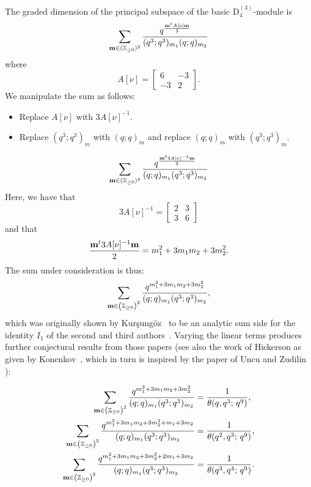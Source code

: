 \documentclass[ALCO,Unicode,published]{cedram}
\begin{document}
The graded dimension of the principal subspace of the basic $\mathrm{D}_4^{(3)}$-module is
\begin{equation}
\sum_{{\bf m} \in (\mathbb{Z}_{\ge 0})^2} \frac{q^{\frac{{\bf m}^t A[\nu] {\bf m}}{2}}}{(q^3;q^3)_{m_1} (q;q)_{m_{2}}}
\end{equation}
where 
$$
A[\nu] = \begin{bmatrix}
6 & -3\\
-3 & 2
\end{bmatrix}.$$
We manipulate the sum as follows:
\begin{itemize}
\item Replace $A[\nu]$ with $3A[\nu]^{-1}$.
\item Replace $(q^3;q^3)_m$ with $(q;q)_m$ and replace $(q;q)_m$ with $(q^3;q^3)_m$.
\end{itemize}
\begin{equation}
\sum_{{\bf m} \in (\mathbb{Z}_{\ge 0})^4} \frac{q^{\frac{{\bf m}^t 3A[\nu]^{-1} {\bf m}}{2}}}{(q;q)_{m_1} (q^3;q^3)_{m_{2}}}
\end{equation}
Here, we have that
$$
3A[\nu]^{-1} = \begin{bmatrix}
2 & 3\\
3 & 6
\end{bmatrix}
$$
and that
$$
\frac{{\bf m}^t 3A[\nu]^{-1} {\bf m}}{2} = m_1^2 + 3m_1 m_2 + 3m_2^2.
$$
The sum under consideration is thus:
$$
\sum_{{\bf m} \in \left(\mathbb{Z}_{\ge 0}\right)^2} \frac{q^{ m_1^2 + 3m_1m_2 + 3m_2^2}}{(q;q)_{m_1}(q^3;q^3)_{m_2}},
$$
which was originally shown  by Kur\c{s}ung\"{o}z~\cite{Kur-KR} to be an analytic sum side for the identity $I_1$ of the second and third authors~\cite{KanRus-idf}.  Varying the linear terms produces further conjectural results from those papers (see also the work of Hickerson as given by Konenkov~\cite{Kon}, which in turn is inspired by the paper of Uncu and Zudilin \cite{UncZud}):
\begin{conj}
\begin{align*}
\sum_{{\bf m} \in \left(\mathbb{Z}_{\ge 0}\right)^2} \frac{q^{ m_1^2 + 3m_1m_2 + 3m_2^2}}{(q;q)_{m_1}(q^3;q^3)_{m_2}} &= 
\dfrac{1}{\theta(q,q^3;\,q^9)},
\\
\sum_{{\bf m} \in \left(\mathbb{Z}_{\ge 0}\right)^2} \frac{q^{ m_1^2 + 3m_1m_2 + 3m_2^2+m_1+3m_2}}{(q;q)_{m_1}(q^3;q^3)_{m_2}} &= 
\dfrac{1}{\theta(q^2,q^3;\,q^9)},
\\
\sum_{{\bf m} \in \left(\mathbb{Z}_{\ge 0}\right)^2} \frac{q^{ m_1^2 + 3m_1m_2 + 3m_2^2+2m_1+3m_2}}{(q;q)_{m_1}(q^3;q^3)_{m_2}} &= 
\dfrac{1}{\theta(q^3,q^4;\,q^9)}.
\end{align*}
\end{conj}
\end{document}
